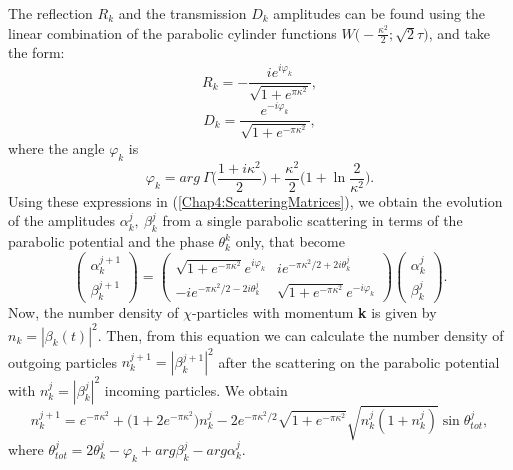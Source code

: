 \documentclass[11pt,a4paper,twoside]{book}
\begin{document}
The reflection $ R_{k} $ and the transmission  $ D_{k} $ amplitudes can be found using  the linear combination of the parabolic cylinder functions $ W\Big(-\frac{\kappa^{2}}{2};\sqrt{2}\tau\Big) $, and take the form:
\begin{equation}
R_{k}=-\frac{ie^{i\varphi_{k}}}{\sqrt{1+e^{\pi \kappa^{2}}}},
\end{equation}
\begin{equation}
	D_{k} = \frac{e^{-i\varphi_{k}}}{\sqrt{1+e^{-\pi \kappa^{2}}}},
\end{equation}
where the angle $ \varphi_{k} $ is
\begin{equation}
\label{Chap4:angleParabolicPotential}
\varphi_{k}=arg\ \Gamma\Bigg(\frac{1+i\kappa^{2}}{2}\Bigg) + \frac{\kappa^{2}}{2}\Bigg(1+\ln \frac{2}{\kappa^{2}}\Bigg).
\end{equation}
Using these expressions in (\ref{Chap4:ScatteringMatrices}), we obtain the evolution of the amplitudes $ \alpha^{j}_{k},\ \beta_{k}^{j} $ from a single parabolic scattering in terms of the parabolic potential and the phase $ \theta_{k}^{k} $ only, that become
\begin{equation}
	\label{Chap4:scatteringMatrix2}
		\left(
	\begin{array}{c}
		\alpha_{k}^{j+1} \\
		\beta_{k}^{j+1}
	\end{array}
	\right)
	=
	\left(
	\begin{array}{cc}
		\sqrt{1+e^{-\pi \kappa^{2}}}e^{i\varphi_{k}}  & ie^{-\pi \kappa^{2}/2 + 2i\theta^{j}_{k}} \\
		-ie^{-\pi \kappa^{2}/2 - 2i\theta^{j}_{k}} & \sqrt{1+e^{-\pi \kappa^{2}}} e^{-i\varphi_{k}}
	\end{array}
	\right)
	\left(
	\begin{array}{c}
		\alpha_{k}^{j}	\\
		\beta_{k}^{j}
	\end{array}
	\right).
\end{equation}
Now, the number density of $\chi$-particles with momentum \textbf{k} is given by $ n_{k} = |\beta_{k}(t)|^{2} $. Then, from this equation we can calculate the number density of outgoing particles $ n_{k}^{j+1}=|\beta_{k}^{j+1}|^{2} $ after the scattering on the parabolic potential with $ n_{k}^{j}=|\beta_{k}^{j}|^{2} $ incoming particles. We obtain
\begin{equation}
\label{Chap4:parabolicPotentialParticles}
n_{k}^{j+1}=e^{-\pi \kappa^{2}} + \Bigg(1+2e^{-\pi \kappa^{2}}\Bigg)n^{j}_{k} - 2e^{-\pi \kappa^{2}/2}\sqrt{1+e^{-\pi \kappa^{2}}}\sqrt{n_{k}^{j}(1+n_{k}^{j})}\sin \theta^{j}_{tot},
\end{equation}
where $ \theta^{j}_{tot}=2\theta^{j}_{k} - \varphi_{k} + arg \beta_{k}^{j} - arg \alpha_{k}^{j} $. 
\end{document}

